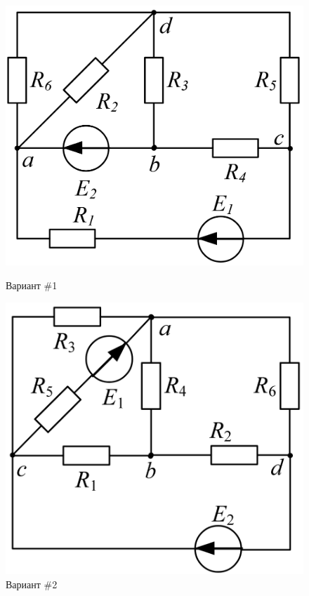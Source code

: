 \begin{figure}[H]
    \centering
    \begin{minipage}{0.48\textwidth}
        \centering
        \includegraphics[width=\textwidth]{images/1_task.png}
        \caption{Вариант \#1}
        \label{fig:task_1}
    \end{minipage}
    \hfill
    \begin{minipage}{0.48\textwidth}
        \centering
        \includegraphics[width=\textwidth]{images/2_task.png}
        \caption{Вариант \#2}
        \label{fig:task_2}
    \end{minipage}
\end{figure}

